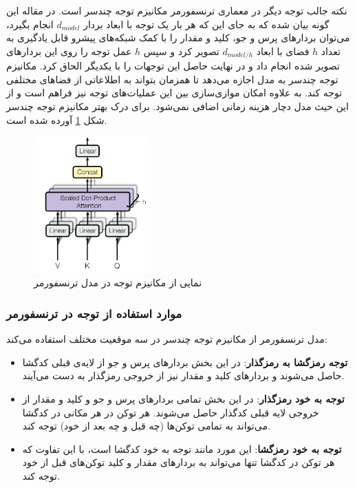 نکته جالب توجه دیگر در معماری ترنسفورمر مکانیزم توجه چندسر است. در مقاله این گونه بیان شده که به جای این که هر بار یک توجه با ابعاد بردار 
$d_{model}$
انجام بگیرد، می‌توان بردارهای پرس و جو، کلید و مقدار را با کمک شبکه‌های پیشرو قابل یادگیری به تعداد
$h$
فضای با ابعاد
$d_{model/h}$
تصویر کرد و سپس 
$h$
عمل توجه را روی این بردار‌های تصویر شده انجام داد و در نهایت حاصل این توجهات را با یکدیگر الحاق کرد. مکانیزم توجه چندسر به مدل اجازه می‌دهد تا همزمان بتواند به اطلاعاتی از فضاهای 
مختلفی توجه کند. به علاوه امکان موازی‌سازی بین این عملیات‌های توجه نیز فراهم است و از این حیث مدل دچار هزینه زمانی اضافی نمی‌شود. برای درک بهتر مکانیزم توجه چندسر شکل 
\ref{fig:chap3:transformer_multihead}
آورده شده است.
\begin{figure}[h]
	\centering
	\includegraphics[width=0.4\textwidth]{images/chap3/transformer_multihead.png}
	\caption{
		نمایی از مکانیزم توجه در مدل ترنسفورمر
		\cite{transformer}
	}
	\label{fig:chap3:transformer_multihead}
\end{figure}


\subsubsection{موارد استفاده از توجه در ترنسفورمر}
مدل ترنسفورمر از مکانیزم توجه چندسر در سه موقعیت مختلف استفاده می‌کند:

\begin{itemize}
	\item 
	\textbf{توجه رمزگشا به رمزگذار}:
	در این بخش بردار‌های پرس و جو از لایه‌ی‌ قبلی کدگشا حاصل می‌شوند و بردارهای کلید و مقدار نیز از خروجی رمزگذار به دست می‌آیند.
	
	\item 
	\textbf{توجه به خود رمزگذار}:
	در این بخش تمامی بردارهای پرس و جو و کلید و مقدار از خروجی لایه قبلی کدگذار حاصل می‌شوند. هر توکن در هر مکانی در کدگشا می‌تواند به تمامی توکن‌ها (چه قبل و چه بعد از خود) توجه کند.
	
	\item
	\textbf{توجه به خود رمزگشا}:
	این مورد مانند توجه به خود کدگشا است، با این تفاوت که هر توکن در کدگشا تنها می‌تواند به بردارهای مقدار و کلید توکن‌های قبل از خود توجه کند.
	
	
\end{itemize}

